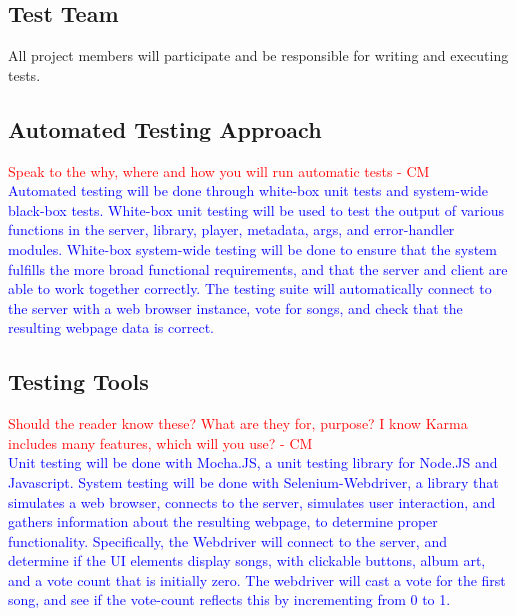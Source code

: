 \documentclass[12pt, titlepage]{article}
\begin{document}
\subsection{Test Team}
All project members will participate and be responsible for writing and executing tests.

\subsection{Automated Testing Approach}
\textcolor{red}{Speak to the why, where and how you will run automatic tests - CM} \\

\textcolor{blue}{
Automated testing will be done through white-box unit tests and system-wide black-box tests.
White-box unit testing will be used to test the output of various functions in the server,
 library, player, metadata, args, and error-handler modules.
White-box system-wide testing will be done to ensure that the system fulfills the more
broad functional requirements, and that the server and client are able to work
together correctly. The testing suite will automatically connect to the server with a
web browser instance, vote for songs, and check that the resulting webpage data is correct.
}

\subsection{Testing Tools}
\textcolor{red}{Should the reader know these? What are they for, purpose? I know Karma includes many features, which will you use? - CM} \\

\textcolor{blue}{
Unit testing will be done with Mocha.JS, a unit testing
library for Node.JS and Javascript.
System testing will be done with Selenium-Webdriver, a library that simulates a web browser, connects to the server,
simulates user interaction, and gathers information about the resulting webpage, to determine
 proper functionality. Specifically, the Webdriver will connect to the server, and determine
 if the UI elements display songs, with clickable buttons, album art, and a vote count that
 is initially zero. The webdriver will cast a vote for the first song, and see if the
 vote-count reflects this by incrementing from 0 to 1.
}
\end{document}

